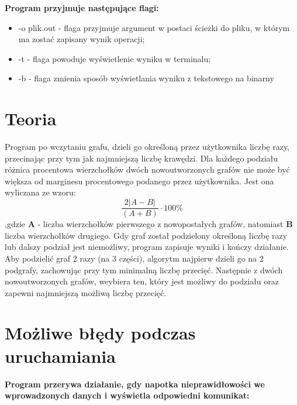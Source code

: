 \documentclass{article}
\begin{document}
\textbf{Program przyjmuje następujące flagi:}
\begin{itemize}
\item -o plik.out - flaga przyjmuje argument w postaci ścieżki do pliku, w którym ma zostać zapisany wynik operacji;

\item -t - flaga powoduje wyświetlenie wyniku w terminalu;

\item -b - flaga zmienia sposób wyświetlania wyniku z tekstowego na binarny
\end{itemize}

\section*{Teoria}

Program po wczytaniu grafu, dzieli go określoną przez użytkownika liczbę razy, przecinając przy tym jak najmniejszą liczbę krawędzi. Dla każdego podziału różnica procentowa wierzchołków dwóch nowoutworzonych grafów nie może być większa od marginesu procentowego podanego przez użytkownika. Jest ona wyliczana ze wzoru: \[ \frac{2|A - B|}{{(A + B)}} \cdot 100\%\],gdzie \textbf{A} - liczba wierzchołków pierwszego z nowopostałych grafów, natomiast \textbf{B} liczba wierzchołków drugiego. Gdy graf został podzielony określoną liczbę razy lub dalszy podział jest niemożliwy, program zapisuje wyniki i kończy działanie.\\

Aby podzielić graf 2 razy (na 3 części), algorytm najpierw dzieli go na 2 podgrafy, zachowując przy tym minimalną liczbę przecięć. Następnie z dwóch nowoutworzonych grafów, weybiera ten, który jest możliwy do podziału oraz zapewni najmniejszą możliwą liczbę przecięć. 

\section*{Możliwe błędy podczas uruchamiania}
\textbf{Program przerywa działanie, gdy napotka nieprawidłowości we wprowadzonych danych i wyświetla odpowiedni komunikat:}
\end{document}
